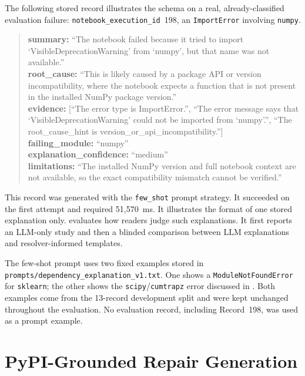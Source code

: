 The following stored record illustrates the schema on a real,
already-classified evaluation failure: \texttt{notebook\_execution\_id}~198,
an \texttt{ImportError} involving \texttt{numpy}.

\begin{quote}
\small
\begin{sloppypar}
\textbf{summary:} ``The notebook failed because it tried to import
`VisibleDeprecationWarning' from `numpy', but that name was not available.''\\[2pt]
\textbf{root\_cause:} ``This is likely caused by a package API or version
incompatibility, where the notebook expects a function that is not present in
the installed NumPy package version.''\\[2pt]
\textbf{evidence:} [``The error type is ImportError.'', ``The error message
says that `VisibleDeprecationWarning' could not be imported from `numpy'.'',
``The root\_cause\_hint is version\_or\_api\_incompatibility.'']\\[2pt]
\textbf{failing\_module:} ``numpy''\\[2pt]
\textbf{explanation\_confidence:} ``medium''\\[2pt]
\textbf{limitations:} ``The installed NumPy version and full notebook context
are not available, so the exact compatibility mismatch cannot be verified.''
\end{sloppypar}
\end{quote}

This record was generated with the \texttt{few\_shot} prompt strategy. It
succeeded on the first attempt and required 51{,}570~ms. It illustrates the
format of one stored explanation only.  evaluates how
readers judge such explanations. It first reports an LLM-only study and then a
blinded comparison between LLM explanations and resolver-informed templates.

The few-shot prompt uses two fixed examples stored in
\texttt{prompts/\allowbreak dependency\_\allowbreak explanation\_\allowbreak v1.txt}. One shows a
\texttt{ModuleNotFoundError} for \texttt{sklearn}; the other shows the
\texttt{scipy}/\texttt{cumtrapz} error discussed in
. Both examples come from the 13-record
development split and were kept unchanged throughout the evaluation. No
evaluation record, including Record~198, was used as a prompt example.


\section{PyPI-Grounded Repair Generation}
\label{sec:m-repair}

